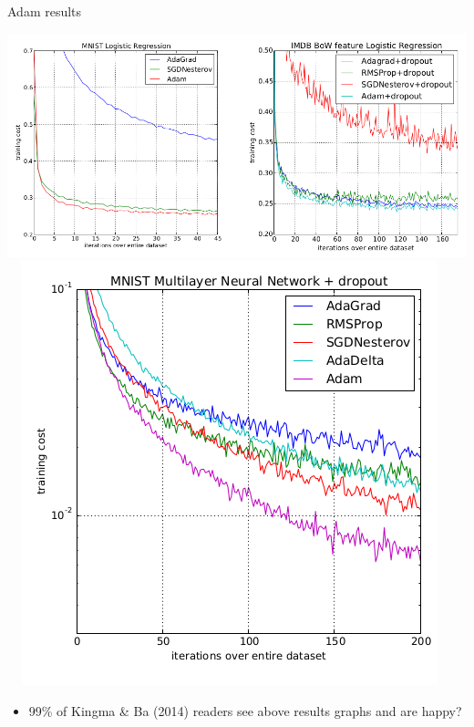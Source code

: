 \documentclass[svgnames,
               hyperref={colorlinks,citecolor=DeepPink4,linkcolor=FireBrick,urlcolor=Maroon},
               usepdftitle=false]  %
               {beamer}
\begin{document}
\begin{frame}{Adam results}

\begin{center}
\mbox{\includegraphics[height=0.42\textheight]{figs/adam-results.png} \,
\includegraphics[height=0.42\textheight]{figs/adam-results-nn.png}}
\end{center}
\begin{itemize}
\item 99\% of Kingma \& Ba (2014) readers see above results graphs and are happy?
\end{itemize}
\end{frame}
\end{document}
